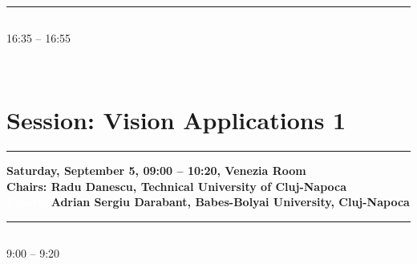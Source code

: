             
            \\ 
            \noindent\rule{\textwidth}{0.4pt}
\vspace*{-36pt}\subsection[ 
    	   {\bf Gesture Recognition Toolkit Using a Kinect Sensor
           } \\
           {\it Marius-Cristian Giuroiu, Tiberiu Marita
           }
	]
	    {
            }
	    16:35 -- 16:55 \nopagebreak

            
            \\ 

\section{{\bf \large Session: %
Vision Applications 1
}}\vspace{-15pt}%
\noindent\rule{\textwidth}{0.4pt} \nopagebreak
{\bf  
Saturday, September 5, 09:00 -- 10:20, Venezia Room
} \\ \nopagebreak
{\bf  Chairs: 
Radu Danescu, Technical University of Cluj-Napoca
} \\ \nopagebreak 
{\bf  \textcolor{white}{Chairs:} 
Adrian Sergiu Darabant, Babes-Bolyai University, Cluj-Napoca
} \\ \nopagebreak 
\noindent\rule{\textwidth}{0.4pt} \nopagebreak

\vspace*{-36pt}\subsection[ 
    	   {\bf Eyeglasses contour extraction using genetic algorithms
           } \\
           {\it Diana Borza, Radu Danescu, Adrian Sergiu Darabant
           }
	]
	    {
            }
	     9:00 -- 9:20 \nopagebreak

